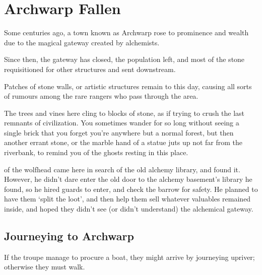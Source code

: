 \section{Archwarp Fallen}
\label{lostcity}

\begin{multicols}{2}


\begin{exampletext}
  Some centuries ago, a town known as Archwarp rose to prominence and wealth due to the magical gateway created by alchemists.

  Since then, the gateway has closed, the population left, and most of the stone requisitioned for other structures and sent downstream.

  Patches of stone walls, or artistic structures remain to this day, causing all sorts of rumours among the rare rangers who pass through the area.
\end{exampletext}

\begin{boxtext}
  The trees and vines here cling to blocks of stone, as if trying to crush the last remnants of civilization.
  You sometimes wander for so long without seeing a single brick that you forget you're anywhere but a normal forest, but then another errant stone, or the marble hand of a statue juts up not far from the riverbank, to remind you of the ghosts resting in this place.
\end{boxtext}

\begin{exampletext}
  \noindent
   of the \gls{wolfhead} came here in search of the old alchemy library, and found it.
  However, he didn't dare enter the old door to the alchemy basement's library he found, so he hired \glspl{guard} to enter, and check the barrow for safety.
  He planned to have them `split the loot', and then help them sell whatever valuables remained inside, and hoped they didn't see (or didn't understand) the alchemical gateway.
\end{exampletext}

\subsection{Journeying to Archwarp}
If the troupe manage to procure a boat, they might arrive by journeying upriver; otherwise they must walk.


\end{multicols}
